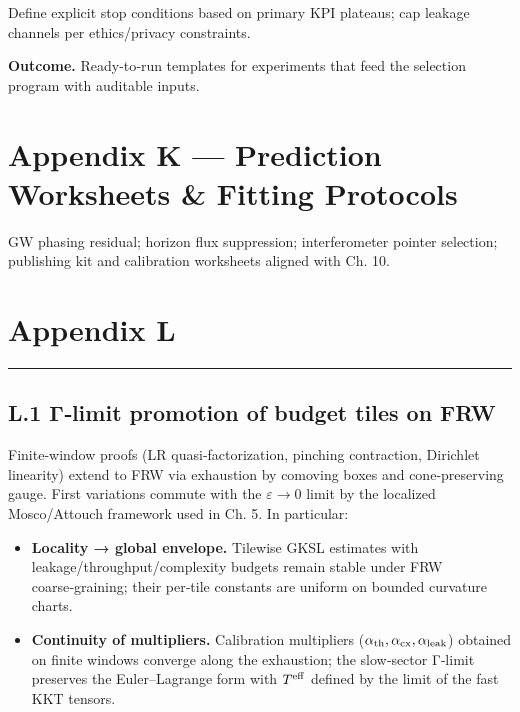 \documentclass[
]{article}
\providecommand{\tightlist}{%
  \setlength{\itemsep}{0pt}\setlength{\parskip}{0pt}}
\numberwithin{equation}{section}
\begin{document}
Define explicit stop conditions based on primary KPI plateaus; cap
leakage channels per ethics/privacy constraints.

\textbf{Outcome.} Ready‑to‑run templates for experiments that feed the
selection program with auditable inputs.

\hypertarget{appendix-k-prediction-worksheets-fitting-protocols}{%
\section{Appendix K --- Prediction Worksheets \& Fitting
Protocols}\label{appendix-k-prediction-worksheets-fitting-protocols}}

GW phasing residual; horizon flux suppression; interferometer pointer
selection; publishing kit and calibration worksheets aligned with Ch.
10.

\hypertarget{appendix-l}{%
\section{Appendix L }\label{appendix-l}}

\begin{center}\rule{0.5\linewidth}{0.5pt}\end{center}

\hypertarget{l.1-ux3b3limit-promotion-of-budget-tiles-on-frw}{%
\subsection{L.1 Γ‑limit promotion of budget tiles on
FRW}\label{l.1-ux3b3limit-promotion-of-budget-tiles-on-frw}}

Finite‑window proofs (LR quasi‑factorization, pinching contraction,
Dirichlet linearity) extend to FRW via exhaustion by comoving boxes and
cone‑preserving gauge. First variations commute with the
\(\varepsilon\to0\) limit by the localized Mosco/Attouch framework used
in Ch. 5. In particular:

\begin{itemize}
\tightlist
\item
  \textbf{Locality → global envelope.} Tilewise GKSL estimates with
  leakage/throughput/complexity budgets remain stable under FRW
  coarse‑graining; their per‑tile constants are uniform on bounded
  curvature charts.
\item
  \textbf{Continuity of multipliers.} Calibration multipliers
  (\(\alpha_{\rm th},\alpha_{\rm cx},\alpha_{\rm leak}\)) obtained on
  finite windows converge along the exhaustion; the slow‑sector Γ‑limit
  preserves the Euler--Lagrange form with \(T^{\rm eff}\) defined by the
  limit of the fast KKT tensors.
\end{itemize}
\end{document}
